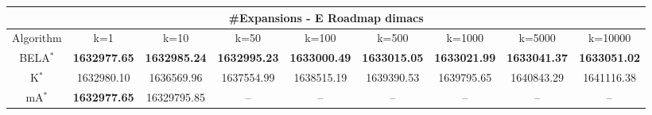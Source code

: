 \begin{tabular}{c|cccccccc}\toprule
\multicolumn{9}{c}{#Expansions - E Roadmap dimacs}\\ \midrule
Algorithm & k=1 & k=10 & k=50 & k=100 & k=500 & k=1000 & k=5000 & k=10000 \\ \midrule
BELA$^*$ & \textbf{1632977.65} & \textbf{1632985.24} & \textbf{1632995.23} & \textbf{1633000.49} & \textbf{1633015.05} & \textbf{1633021.99} & \textbf{1633041.37} & \textbf{1633051.02} \\
K$^*$ & 1632980.10 & 1636569.96 & 1637554.99 & 1638515.19 & 1639390.53 & 1639795.65 & 1640843.29 & 1641116.38 \\
mA$^*$ & \textbf{1632977.65} & 16329795.85 & -- & -- & -- & -- & -- & -- \\ \bottomrule 
\end{tabular}

